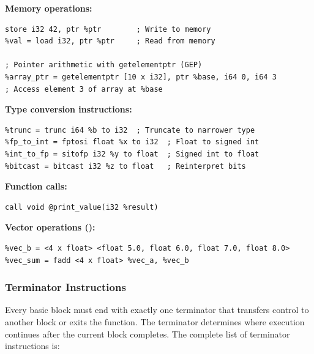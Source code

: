 \textbf{Memory operations:}

\begin{lstlisting}[style=ir]
%ptr = alloca i32             ; Stack allocation
store i32 42, ptr %ptr        ; Write to memory
%val = load i32, ptr %ptr     ; Read from memory

; Pointer arithmetic with getelementptr (GEP)
%array_ptr = getelementptr [10 x i32], ptr %base, i64 0, i64 3
; Access element 3 of array at %base
\end{lstlisting}

\textbf{Type conversion instructions:}

\begin{lstlisting}[style=ir]
%ext = zext i32 %a to i64     ; Zero-extend to wider type
%trunc = trunc i64 %b to i32  ; Truncate to narrower type
%fp_to_int = fptosi float %x to i32  ; Float to signed int
%int_to_fp = sitofp i32 %y to float  ; Signed int to float
%bitcast = bitcast i32 %z to float   ; Reinterpret bits
\end{lstlisting}

\textbf{Function calls:}

\begin{lstlisting}[style=ir]
%result = call i32 @compute(i32 %x, i32 %y)
call void @print_value(i32 %result)
\end{lstlisting}

\textbf{Vector operations ():}

\begin{lstlisting}[style=ir]
%vec_a = <4 x float> <float 1.0, float 2.0, float 3.0, float 4.0>
%vec_b = <4 x float> <float 5.0, float 6.0, float 7.0, float 8.0>
%vec_sum = fadd <4 x float> %vec_a, %vec_b
\end{lstlisting}

\subsubsection{Terminator Instructions}

Every basic block must end with exactly one terminator that transfers control to another block or exits the function. The terminator determines where execution continues after the current block completes. The complete list of terminator instructions is:

